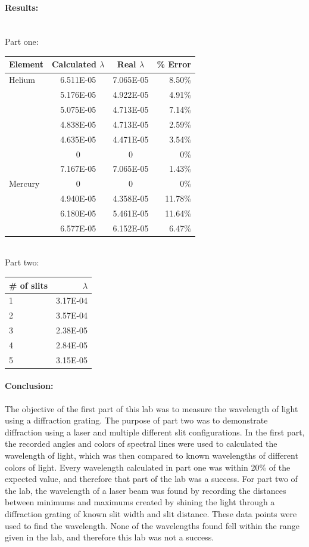 \documentclass[12pt]{article}
\begin{document}
\paragraph{Results:} \mbox{} \\
Part one:
\begin{tabular}{| l | c | c | r |}
	\hline
	Element & Calculated $\lambda$ & Real $\lambda$ & \% Error \\ \hline
	Helium & 6.511E-05 & 7.065E-05 & 8.50\% \\
	& 5.176E-05 & 4.922E-05 & 4.91\% \\
	& 5.075E-05 & 4.713E-05 & 7.14\% \\
	& 4.838E-05 & 4.713E-05 & 2.59\% \\
	& 4.635E-05 & 4.471E-05 & 3.54\% \\
	& 0 & 0 & 0\% \\
	& 7.167E-05 & 7.065E-05 & 1.43\% \\	\hline
	Mercury & 0 & 0 & 0\% \\
	& 4.940E-05 & 4.358E-05 & 11.78\% \\
	& 6.180E-05 & 5.461E-05 & 11.64\% \\
	& 6.577E-05 & 6.152E-05 &  6.47\% \\ \hline
\end{tabular} \mbox{} \\
Part two:
\begin{tabular}{| l | r |}
	\hline
	\# of slits & $\lambda$ \\ \hline
	1 & 3.17E-04 \\
	2 & 3.57E-04 \\
	3 & 2.38E-05 \\
	4 & 2.84E-05 \\
	5 & 3.15E-05 \\ \hline
\end{tabular}

\paragraph{Conclusion:} The objective of the first part of this lab was to measure the wavelength of light using a diffraction grating. The purpose of part two was to demonstrate diffraction using a laser and multiple different slit configurations. In the first part, the recorded angles and colors of spectral lines were used to calculated the wavelength of light, which was then compared to known wavelengths of different colors of light. Every wavelength calculated in part one was within 20\% of the expected value, and therefore that part of the lab was a success. For part two of the lab, the wavelength of a laser beam was found by recording the distances between minimums and maximums created by shining the light through a diffraction grating of known slit width and slit distance. These data points were used to find the wavelength. None of the wavelengths found fell within the range given in the lab, and therefore this lab was not a success.
\end{document}
